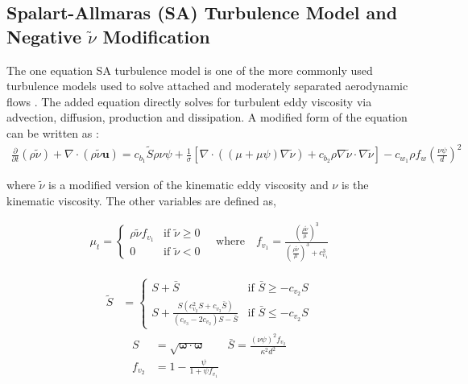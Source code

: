 \subsection{Spalart-Allmaras (SA) Turbulence Model and Negative $\tilde\nu$ Modification}
The one equation SA turbulence model is one of the more commonly used turbulence models used to solve attached and moderately separated aerodynamic flows \cite{spalart1992one}. The added equation directly solves for turbulent eddy viscosity via advection, diffusion, production and dissipation. A modified form of the equation can be written as \cite{burgess2012robust,oliver2008high,moro2011navier}:
\begin{align}
	\frac{\partial}{\partial t}(\rho\tilde\nu) + \nabla\cdot(\rho\tilde\nu\boldsymbol{u}) = c_{b_1}\tilde S \rho\nu\psi + \frac{1}{\sigma}\left[\nabla\cdot((\mu + \mu\psi)\nabla\tilde\nu) + c_{b_2}\rho\nabla\tilde\nu\cdot\nabla\tilde\nu\right] - c_{w_1}\rho f_w \left(\frac{\nu\psi}{d}\right)^2
\end{align}

where $\tilde\nu$ is a modified version of the kinematic eddy viscosity and $\nu$ is the kinematic viscosity. The other variables are defined as,

\begin{align}
	 \mu_t =
	  \begin{cases}
	   \rho\tilde\nu f_{v_1} & \text{if } \tilde\nu \ge 0 \\
	   0       & \text{if } \tilde\nu < 0
	  \end{cases}
	  \quad \mbox{where} \quad f_{v_1} = \frac{\left(\frac{\rho\tilde\nu}{\mu}\right)^3}{\left(\frac{\rho\tilde\nu}{\mu}\right)^3 + c_{v_1}^3}
\end{align}

\begin{align}
	\tilde S &=
	\begin{cases}
	   S + \bar S & \text{if } \bar S \ge -c_{v_2}S \\
	   S + \frac{S(c_{v_2}^2 S + c_{v_3}\bar S)}{(c_{v_3} - 2c_{v_2})S - \bar S} & \text{if } \bar S \le -c_{v_2}S
	\end{cases}
\end{align}
\begin{align}
	S &= \sqrt{\boldsymbol{\omega}\cdot\boldsymbol{\omega}}
	\qquad \bar S = \frac{(\nu\psi)^2 f_{v_2}}{\kappa^2 d^2} \\
	f_{v_2} &= 1 - \frac{\psi}{1 + \psi f_{v_1}}
\end{align}

